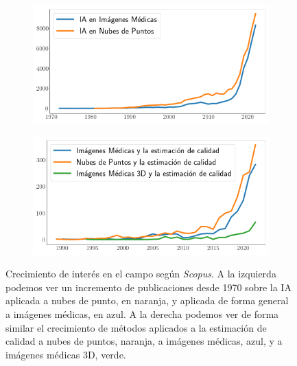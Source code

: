 \begin{figure}[H]
  \centering
  \begin{subfigure}{0.49\textwidth}
    \includegraphics[width=\textwidth]{imagenes/chapter3/ScopusMLinMedicineAndPC.png}
  \end{subfigure}
  \begin{subfigure}{0.5\textwidth}
    \includegraphics[width=\textwidth]{imagenes/chapter3/ScopusQualityAssessment.png}
  \end{subfigure}
  \caption[Crecimiento de interés en el campo según \emph{Scopus}.]{Crecimiento de interés en el campo según \emph{Scopus}\footnotemark[1].
  A la izquierda podemos ver un incremento de publicaciones desde 
  1970 sobre la IA aplicada a nubes de punto, en naranja, 
  y aplicada de forma general a imágenes médicas, en azul. A la derecha 
  podemos ver de forma similar el crecimiento de métodos aplicados
  a la estimación de calidad a nubes de puntos, naranja, a imágenes médicas, azul, y 
  a imágenes médicas 3D, verde.
  }
  \label{fig:ScopusMLinMedicalAndPC}
\end{figure}

